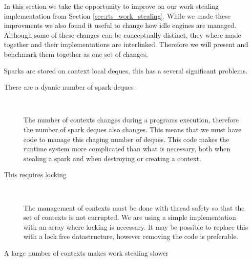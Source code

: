 

In this section we take the opportunity to improve on our work stealing
implementation from Section \ref{sec:rts_work_stealing}.
While we made these improvments we also found it useful to change how idle
engines are managed.
Although some of these changes can be conceptually distinct,
they where made together and their implementations are interlinked.
Therefore we will present and benchmark them together as one set of changes.

Sparks are stored on context local deques,
this has a several significant problems.

\begin{description}

    \item[There are a dyanic number of spark deques]~

    The number of contexts changes during a programs execution,
    therefore the number of spark deques also changes.
    This means that we must have code to manage this chaging number of
    deques.
    This code makes the runtime system more complicated than what is
    necessary,
    both when stealing a spark and when destroying or creating a context.

    \item[This requires locking]~

    The management of contexts must be done with thread safety so that the
    set of contexts is not currupted.
    We are using a simple implementation with an array where locking is
    necessary.
    It may be possible to replace this with a lock free datastructure,
    however removing the code is preferable.

    \item[A large number of contexts makes work stealing slower]~
    

\end{description}

